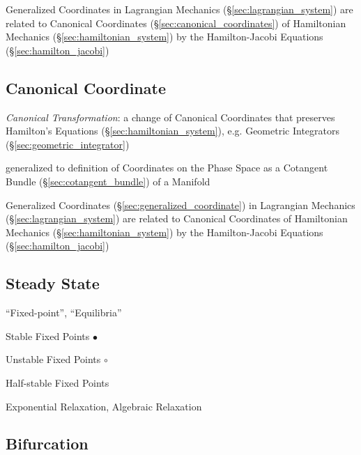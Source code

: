 Generalized Coordinates in Lagrangian Mechanics (\S\ref{sec:lagrangian_system})
are related to Canonical Coordinates (\S\ref{sec:canonical_coordinates}) of
Hamiltonian Mechanics (\S\ref{sec:hamiltonian_system}) by the Hamilton-Jacobi
Equations (\S\ref{sec:hamilton_jacobi})



\subsection{Canonical Coordinate}\label{sec:canonical_coordinate}

\emph{Canonical Transformation}: a change of Canonical Coordinates that
preserves Hamilton's Equations (\S\ref{sec:hamiltonian_system}), e.g. Geometric
Integrators (\S\ref{sec:geometric_integrator})

generalized to definition of Coordinates on the Phase Space as a Cotangent
Bundle (\S\ref{sec:cotangent_bundle}) of a Manifold

Generalized Coordinates (\S\ref{sec:generalized_coordinate}) in Lagrangian
Mechanics (\S\ref{sec:lagrangian_system}) are related to Canonical Coordinates
of Hamiltonian Mechanics (\S\ref{sec:hamiltonian_system}) by the
Hamilton-Jacobi Equations (\S\ref{sec:hamilton_jacobi})



\subsection{Steady State}\label{sec:steady_state}

``Fixed-point'', ``Equilibria'' %

Stable Fixed Points $\bullet$

Unstable Fixed Points $\circ$

Half-stable Fixed Points

Exponential Relaxation, Algebraic Relaxation



\subsection{Bifurcation}\label{sec:bifurcation}


